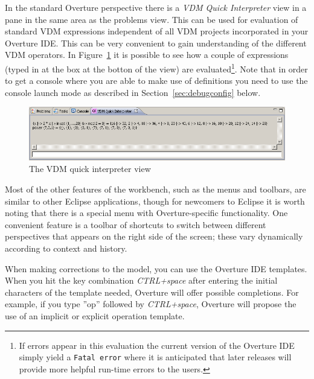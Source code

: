 In the standard Overture perspective there is a \emph{VDM Quick
  Interpreter} view in a pane in the same area as the problems
view. This can be used for evaluation of standard VDM expressions
independent of all VDM projects incorporated in your Overture
IDE. This can be very convenient to gain understanding of the
different VDM operators. In Figure~\ref{fig:QuickIntView} it is
possible to see how a couple of expressions (typed in at the box at
the botton of the view) are evaluated\footnote{If errors appear in
  this evaluation the current version of the Overture IDE simply yield
  a \texttt{Fatal error} where it is anticipated that later releases
  will provide more helpful run-time errors to the users.}. Note that
in order to get a console where you are able to make use of
definitions you need to use the console launch mode as described in
Section~\ref{sec:debugconfig} below. 

\begin{figure}[!htb]
\begin{center}
  \includegraphics[width=4.5in]{figures/quickinterpreter}
  \caption[labelInTOC]{The VDM quick interpreter view}
  \label{fig:QuickIntView}
\end{center}
\end{figure}

Most of the other features of the workbench, such as the menus and
toolbars, are similar to other Eclipse applications, though for
newcomers to Eclipse it is worth noting that there is a special menu
with Overture-specific functionality. One convenient feature is a
toolbar of shortcuts to switch between different perspectives that
appears on the right side of the screen; these vary dynamically
according to context and history.

When making corrections to the model, you can use the Overture IDE
templates. When you hit the key combination \textit{CTRL+space} after
entering the initial characters of the template needed, Overture will
offer possible completions. For example, if you type ''op'' followed by
\textit{CTRL+space}, Overture will propose the use of an implicit or
explicit operation template.

